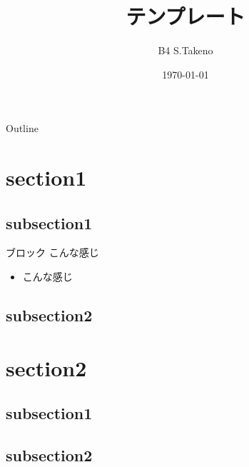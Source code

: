 \documentclass[dvipdfmx, 10.5pt]{beamer}
\title[]{テンプレート}
\author[S.Takeno]{B4 S.Takeno}
\date[\today]{\today}
\institute[NIT]{Nagoya Institute of Technology \\ Takeuchi \& Karasuyama Lab}
\begin{document}
\begin{frame}{}
\maketitle%
\thispagestyle{empty}%
\addtocounter{framenumber}{-1}%
\end{frame}
\begin{frame}{Outline}
\tableofcontents[hideallsubsections]
\end{frame}

\section{section1}
\subsection{subsection1}
\begin{frame}{\insertsubsection}
\begin{block}{ブロック}
こんな感じ
\end{block}
\begin{itemize}
\item こんな感じ
\end{itemize}
\end{frame}
\subsection{subsection2}
\begin{frame}{\insertsubsection}

\end{frame}

\section{section2}
\subsection{subsection1}
\begin{frame}{\insertsubsection}

\end{frame}

\begin{frame}{\insertsubsection}

\end{frame}
\subsection{subsection2}
\begin{frame}{\insertsubsection}

\end{frame}
\end{document}
